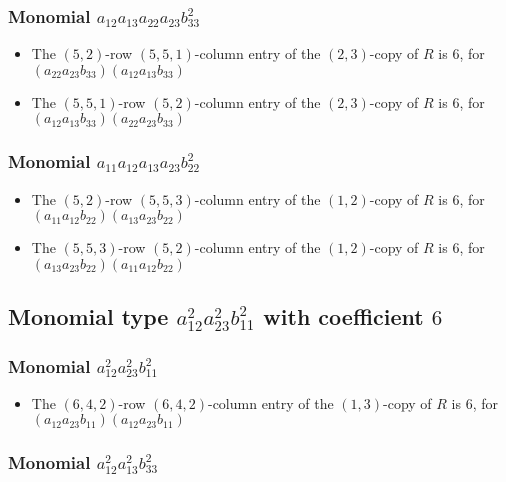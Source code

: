 \documentclass{article}
\begin{document}
\subsubsection{Monomial $ a_{12} a_{13} a_{22} a_{23} b_{33}^{2} $}

\begin{itemize}
\item The $(5, 2)$-row $(5, 5, 1)$-column entry of the $ \left(2, 3\right) $-copy of $R$ is $ 6 $, for $( a_{22} a_{23} b_{33} )( a_{12} a_{13} b_{33} )$ 
\item The $(5, 5, 1)$-row $(5, 2)$-column entry of the $ \left(2, 3\right) $-copy of $R$ is $ 6 $, for $( a_{12} a_{13} b_{33} )( a_{22} a_{23} b_{33} )$ 
\end{itemize}
\subsubsection{Monomial $ a_{11} a_{12} a_{13} a_{23} b_{22}^{2} $}

\begin{itemize}
\item The $(5, 2)$-row $(5, 5, 3)$-column entry of the $ \left(1, 2\right) $-copy of $R$ is $ 6 $, for $( a_{11} a_{12} b_{22} )( a_{13} a_{23} b_{22} )$ 
\item The $(5, 5, 3)$-row $(5, 2)$-column entry of the $ \left(1, 2\right) $-copy of $R$ is $ 6 $, for $( a_{13} a_{23} b_{22} )( a_{11} a_{12} b_{22} )$ 
\end{itemize}
\subsection{Monomial type $ a_{12}^{2} a_{23}^{2} b_{11}^{2} $ with coefficient $ 6 $}

\subsubsection{Monomial $ a_{12}^{2} a_{23}^{2} b_{11}^{2} $}

\begin{itemize}
\item The $(6, 4, 2)$-row $(6, 4, 2)$-column entry of the $ \left(1, 3\right) $-copy of $R$ is $ 6 $, for $( a_{12} a_{23} b_{11} )( a_{12} a_{23} b_{11} )$ 
\end{itemize}
\subsubsection{Monomial $ a_{12}^{2} a_{13}^{2} b_{33}^{2} $}
\end{document}
